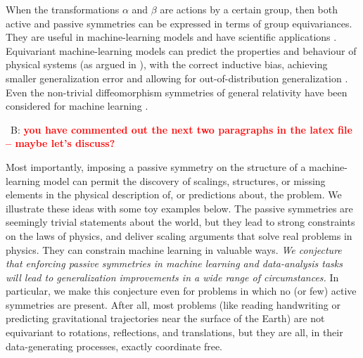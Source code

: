 \documentclass[11pt]{article}
\newcommand{\bernhard}[1]{~B: \textcolor{red}{\textbf{#1}}}
\begin{document}
When the transformations $\alpha$ and $\beta$ are actions by a certain group, then both active and passive symmetries can be expressed in terms of group equivariances.
They are useful in machine-learning models \cite{cohen2016group, kondor2018convolution, thomas2018tensor, geiger2022e3nn, finzi2020generalizing, finzi2021practical} and have scientific applications \cite{batzner20223, musaelian2022learning, stark2022equibind, yu-physics, wang2022approximately}.
Equivariant machine-learning models can predict the properties and behaviour of physical systems (as argued in \cite{cheng2019covariance}), with the correct inductive bias, achieving smaller generalization error \cite{bietti2021sample, elesedy2021provably, elesedy2021kernel, mei2021learning} and allowing for out-of-distribution generalization \cite{villar2022dimensionless}. 
Even the non-trivial diffeomorphism symmetries of general relativity have been considered for machine learning \cite{weiler}.

\bernhard{you have commented out the next two paragraphs in the latex file -- maybe let's discuss?}

Most importantly, imposing a passive symmetry on the structure of a machine-learning model can permit the discovery of scalings, structures, or missing elements in the physical description of, or predictions about, the problem.
We illustrate these ideas with some toy examples below.
The passive symmetries are seemingly trivial statements about the world, but they lead to strong constraints on the laws of physics, and deliver scaling arguments that solve real problems in physics.
They can constrain machine learning in valuable ways.
\emph{We conjecture that enforcing passive symmetries in machine learning and data-analysis tasks will lead to generalization improvements in a wide range of circumstances.}
In particular, we make this conjecture even for problems in which no (or few) active symmetries are present.
After all, most problems (like reading handwriting or predicting gravitational trajectories near the surface of the Earth) are not equivariant to rotations, reflections, and translations, but they are all, in their data-generating processes, exactly coordinate free.
\end{document}
